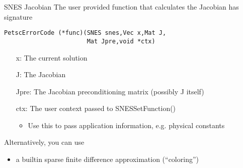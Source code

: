 \begin{frame}[fragile]{SNES Jacobian}
The user provided function that calculates the Jacobian has signature
\begin{verbatim}
PetscErrorCode (*func)(SNES snes,Vec x,Mat J,
                       Mat Jpre,void *ctx)
\end{verbatim}

\begin{itemize}
  \item[{\kb x}:] The current solution
  \item[{\kb J}:] The Jacobian
  \item[{\kb Jpre}:] The Jacobian preconditioning matrix (possibly J itself)
  \item[{\kb ctx}:] The user context passed to {\kb SNESSetFunction()}
  \begin{itemize}
    \item Use this to pass application information, e.g. physical constants
  \end{itemize}
\end{itemize}

Alternatively, you can use
\begin{itemize}
  \item a builtin sparse finite difference approximation (``coloring'')
\end{itemize}

\end{frame}
